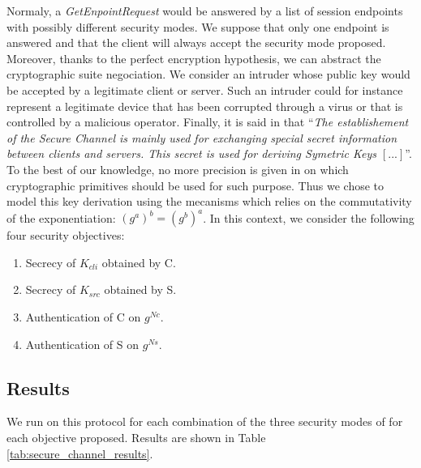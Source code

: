 Normaly, a {\em GetEnpointRequest} would be answered by a list of
session endpoints with possibly different security modes. We suppose
that only one endpoint is answered and that the client will always
accept the security mode proposed.  Moreover, thanks to the perfect
encryption hypothesis, we can abstract the cryptographic suite
negociation.  We consider an intruder whose public key would be
accepted by a legitimate client or server.  Such an intruder could for
instance represent a legitimate device that has been corrupted through
a virus or that is controlled by a malicious operator.  Finally, it is
said in \cite{MLD09} that ``\emph{The establishement of the Secure
  Channel is mainly used for exchanging special secret information
  between clients and servers. This secret is used for deriving
  Symetric Keys $[...]$}''.  To the best of our knowledge, no more
precision is given in \cite{MLD09,opcua_part2,opcua_part4,opcua_part6}
on which cryptographic primitives should be used for such purpose.
Thus we chose to model this key derivation using the \DiH mecanisms
which relies on the commutativity of the exponentiation: $(g^a)^b =
(g^b)^a$.  In this context, we consider the following four security
objectives:
\begin{enumerate}
    \item\label{item:sc_sec_cli} Secrecy of $K_{cli}$ obtained by C.
    \item\label{item:sc_sec_srv} Secrecy of $K_{src}$ obtained by S.
    \item\label{item:sc_auth_cli} Authentication of C on $g^{Nc}$.
    \item\label{item:sc_auth_srv} Authentication of S on $g^{Ns}$.
\end{enumerate}

\subsection{Results}\label{sec:secure_channel_res}

We run \proverif on this protocol for each combination of the three security
modes of \opcua for each objective proposed.
Results are shown in Table \ref{tab:secure_channel_results}.

